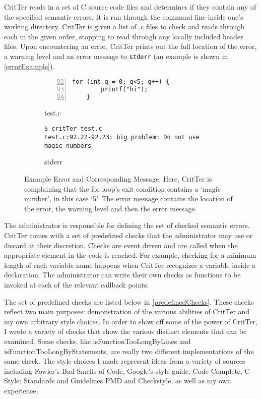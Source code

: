 \documentclass[12pt]{report}
\newcommand{\programName}{CritTer\xspace}
\begin{document}
\programName reads in a set of C source code files and determines if they contain any of the 
specified semantic errors. It is run through the command line inside one's 
working directory. \programName is given a list of .c files to check and reads through each in the 
given order, stopping to read through any locally included header files. Upon encountering an error,
\programName prints out the full location of the error, a warning level and an error message to 
\lstinline{stderr} (an example is shown in \autoref{errorExample}). 

\begin{figure}
\begin{subfigure}[b]{.49\linewidth}
\caption{test.c}
\label{errorExampleCode}
\begin{lstlisting}[numbers=left, firstnumber=92, xleftmargin=.8cm]
	for (int q = 0; q<5; q++) {
		printf("hi");
	}
\end{lstlisting}
\end{subfigure}
\begin{subfigure}[b]{.49\linewidth}
\caption{stderr}
\label{errorExampleStderr}
\begin{lstlisting}[xleftmargin=.7cm]
$ critTer test.c
test.c:92.22-92.23: big problem: Do not use magic numbers
\end{lstlisting}
\end{subfigure}
\caption[Example Error and Corresponding Message]{Example Error and Corresponding Message. Here, \programName is complaining that the for loop's exit condition contains a `magic number', in this case `5'. The error message contains the location of the error, the warning level and then the error message.}
\label{errorExample}
\end{figure}

The administrator is responsible for defining the set of checked semantic errors. \programName 
comes with a set of predefined checks that the administrator may use or discard at their discretion. 
Checks are event driven and are called when the appropriate element in the code is reached. For 
example, checking for a minimum length of each variable name happens when \programName 
recognizes a variable inside a declaration. The administrator can write their own checks as functions 
to be invoked at each of the relevant callback points.

The set of predefined checks are listed below in \autoref{predefinedChecks}. These checks reflect 
two main purposes: demonstration of the various abilities of \programName and my own arbitrary style 
choices. In order to show off some of the power of \programName, I wrote a variety of checks that show 
the various distinct elements that can be examined. Some checks, like isFunctionTooLongByLines and 
isFunctionTooLongByStatements, are really two different implementations of the same check. The style 
choices I made represent ideas from a variety of sources including Fowler's Bad Smells of 
Code\cite{refactoring}, Google's style guide\cite{googleStyle}, Code Complete\cite{code-complete}, 
C-Style: Standards and Guidelines\cite{standards} PMD\cite{pmd} and Checkstyle\cite{checkstyle}, as 
well as my own experience.
\end{document}
